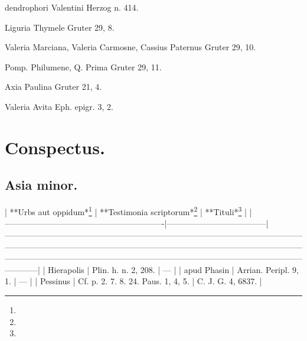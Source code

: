 \documentclass[a4paper, 11pt, oneside, polutonikogreek, german]{article}
\begin{document}
dendrophori Valentini Herzog n. 414.

Liguria Thymele Gruter 29, 8.

Valeria Marciana, Valeria Carmosne, Cassius Paternus Gruter 29, 10.

Pomp. Philumene, Q. Prima Gruter 29, 11.

Axia Paulina Gruter 21, 4.

Valeria Avita Eph. epigr. 3, 2.
\clearpage
\section{Conspectus.}
\subsection{Asia minor.}
| **Urbs aut oppidum*\footnote{}                                     | **Testimonia scriptorum*\footnote{}          | **Tituli*\footnote{}                                                                                                                                                                                                                                                                                                                                     |
|----------------------------------------------------------|------------------------------------|------------------------------------------------------------------------------------------------------------------------------------------------------------------------------------------------------------------------------------------------------------------------------------------------------------------------------------------------|
| Hierapolis                                               | Plin. h. n. 2, 208.                | ---                                                                                                                                                                                                                                                                                                                                            |
| apud Phasin                                              | Arrian. Peripl. 9, 1.              | ---                                                                                                                                                                                                                                                                                                                                            |
| Pessinus                                                 | Cf. p. 2. 7. 8. 24. Paus. 1, 4, 5. | C. J. G. 4, 6837.                                                                                                                                                                                                                                                                                                                              |
\end{document}
